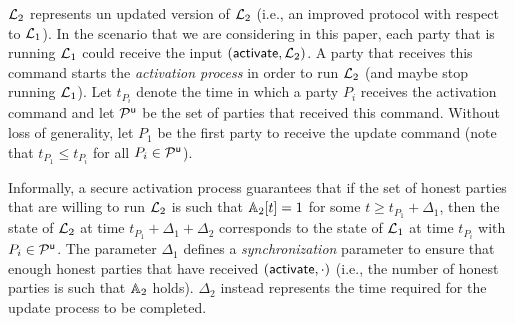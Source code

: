 $\mathcal{L}_2$ represents un updated version of $\mathcal{L}_2$ (i.e., an improved protocol with respect to $\mathcal{L}_1$).
In the scenario that we are considering in this paper, each party that is running $\mathcal{L}_1$ could receive the input $(\mathsf{activate}, \mathcal{L}_2)$. A party
that receives this command starts the \emph{activation process}
in order to run $\mathcal{L}_2$ (and maybe stop running $\mathcal{L}_1$).
Let $t_{P_i}$ denote the time in which 
a party $P_i$ receives the activation command and let $\mathcal{P}^\mathsf{u}$ be the set of parties that received this command. Without loss of generality, let $P_1$ be the first party to receive the update command (note that $t_{P_1}\leq t_{P_i}$ for all $P_i\in\mathcal{P}^\mathsf{u}$).

Informally, a secure activation process guarantees that if the set of honest parties that are willing to run $\mathcal{L}_2$ 
is such that $\mathbb{A}_2[t]=1$ for some $t\geq t_{P_1}+\Delta_1$, then
the state of $\mathcal{L}_2$ at time $t_{P_1}+\Delta_1+\Delta_2$ corresponds to the state of $\mathcal{L}_1$ at time $t_{P_i}$ with $P_i\in\mathcal{P}^\mathsf{u}$.
The parameter $\Delta_1$ defines a \emph{synchronization} parameter to ensure that enough honest parties that have received $(\mathsf{activate},\cdot)$ (i.e., the number of honest parties is such that $\mathbb{A}_2$ holds). $\Delta_2$ instead represents the time required for the update process to be completed.

 


